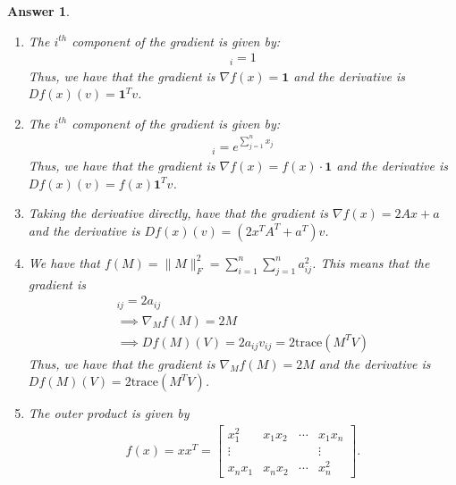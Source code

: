 \documentclass[12pt]{article}
\theoremstyle{colon}
\newtheorem*{answer}{Answer}
\begin{document}
\begin{answer}
  \

  \begin{enumerate}[label=\alph*)]
    \item The $i^{th}$ component of the gradient is given by:
      \begin{gather*}
        [\nabla f(x)]_i = 1
      \end{gather*}
      Thus, we have that the gradient is $\nabla f(x) = \bm{1}$ and the derivative is $Df(x)(v) = \bm{1}^T v$.

    \item The $i^{th}$ component of the gradient is given by:
      \begin{gather*}
        [\nabla f(x)]_i = e^{\sum_{j=1}^n x_j}
      \end{gather*}
      Thus, we have that the gradient is $\nabla f(x) = f(x) \cdot \bm{1}$ and the derivative is $Df(x)(v) = f(x) \bm{1}^T v$.

    \item Taking the derivative directly, have that the gradient is $\nabla f(x) = 2 Ax + a$ and the derivative is $Df(x)(v) = (2x^T A^T + a^T) v$.

    \item We have that $f(M) = \lVert M \rVert_F^2 = \sum_{i=1}^n \sum_{j=1}^n a_{ij}^2$. This means that the gradient is
      \begin{gather*}
        [\nabla_M f(M)]_{ij} = 2 a_{ij} \\
        \implies \nabla_M f(M) = 2M \\
        \implies D f(M)(V) = 2 a_{ij} v_{ij} = 2 \text{trace}(M^T V)
      \end{gather*}
      Thus, we have that the gradient is $\nabla_M f(M) = 2M$ and the derivative is $Df(M)(V) = 2 \text{trace}(M^T V)$.

    \item The outer product is given by
      \begin{gather*}
        f(x) = x x^T = \begin{bmatrix} x_1^2 & x_1 x_2 & \dotsm & x_1 x_n \\ \vdots & & & \vdots \\ x_n x_1 & x_n x_2 & \dotsm & x_n^2 \end{bmatrix}.
      \end{gather*}


\end{enumerate}
\end{answer}
\end{document}
